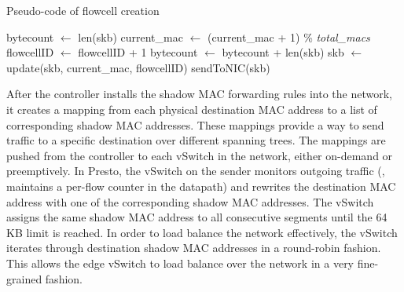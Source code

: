 \begin{algorithm}[t]
\caption{Pseudo-code of flowcell creation}
\label{alg:flowcell}
\begin{algorithmic}[1]
\STATE bytecount $\leftarrow$ len(skb)
\STATE current\_mac $\leftarrow$ (current\_mac + 1) \% {\emph {total\_macs}}
\STATE flowcellID $\leftarrow$ flowcellID + 1
\ELSE
\STATE bytecount $\leftarrow$ bytecount + len(skb)
\ENDIF
\STATE skb $\leftarrow$ update(skb, current\_mac, flowcellID)
\STATE sendToNIC(skb)
\end{algorithmic}
\end{algorithm}
After the controller installs the shadow MAC forwarding rules into the network, it creates a mapping
from each physical destination MAC address to a list of corresponding shadow MAC addresses. These mappings
provide a way to send traffic to a specific destination over different spanning trees. 
The mappings are pushed from the controller to each vSwitch in the network, either on-demand or preemptively.
In Presto, the vSwitch on the sender monitors outgoing traffic (\ie{}, maintains a per-flow counter in the datapath) 
and rewrites the destination MAC
address with one of the corresponding shadow MAC addresses.
The vSwitch assigns the same shadow MAC address to all consecutive segments until the 64 KB limit is reached.
In order to load balance the network effectively, the vSwitch 
iterates through destination shadow MAC addresses in a round-robin fashion. 
This allows the edge vSwitch to load balance over the network in a very fine-grained fashion.

